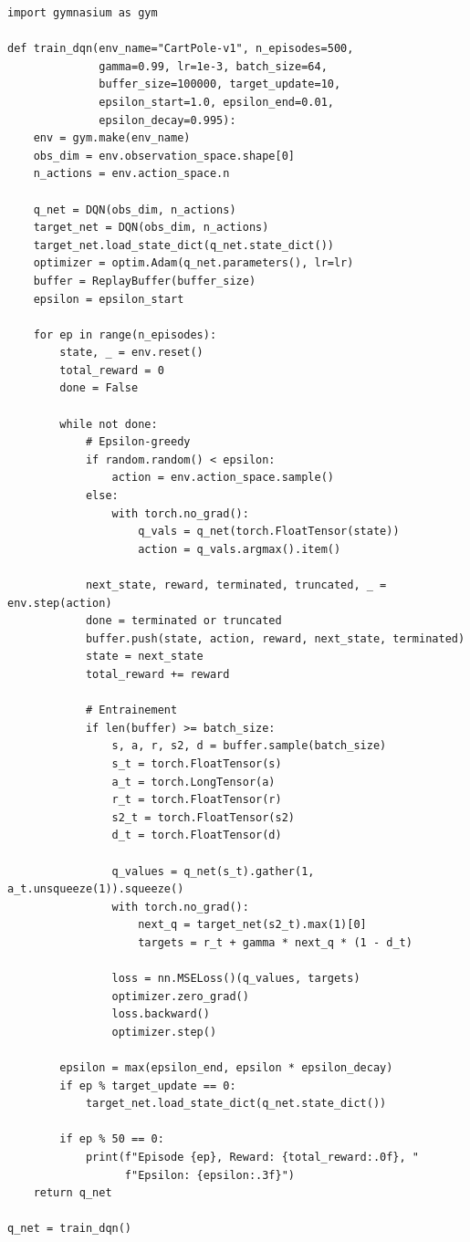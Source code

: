 \begin{codeblock}[title=\textbf{Boucle d'entra\^inement DQN}]
\begin{verbatim}
import gymnasium as gym

def train_dqn(env_name="CartPole-v1", n_episodes=500,
              gamma=0.99, lr=1e-3, batch_size=64,
              buffer_size=100000, target_update=10,
              epsilon_start=1.0, epsilon_end=0.01,
              epsilon_decay=0.995):
    env = gym.make(env_name)
    obs_dim = env.observation_space.shape[0]
    n_actions = env.action_space.n

    q_net = DQN(obs_dim, n_actions)
    target_net = DQN(obs_dim, n_actions)
    target_net.load_state_dict(q_net.state_dict())
    optimizer = optim.Adam(q_net.parameters(), lr=lr)
    buffer = ReplayBuffer(buffer_size)
    epsilon = epsilon_start

    for ep in range(n_episodes):
        state, _ = env.reset()
        total_reward = 0
        done = False

        while not done:
            # Epsilon-greedy
            if random.random() < epsilon:
                action = env.action_space.sample()
            else:
                with torch.no_grad():
                    q_vals = q_net(torch.FloatTensor(state))
                    action = q_vals.argmax().item()

            next_state, reward, terminated, truncated, _ = env.step(action)
            done = terminated or truncated
            buffer.push(state, action, reward, next_state, terminated)
            state = next_state
            total_reward += reward

            # Entrainement
            if len(buffer) >= batch_size:
                s, a, r, s2, d = buffer.sample(batch_size)
                s_t = torch.FloatTensor(s)
                a_t = torch.LongTensor(a)
                r_t = torch.FloatTensor(r)
                s2_t = torch.FloatTensor(s2)
                d_t = torch.FloatTensor(d)

                q_values = q_net(s_t).gather(1, a_t.unsqueeze(1)).squeeze()
                with torch.no_grad():
                    next_q = target_net(s2_t).max(1)[0]
                    targets = r_t + gamma * next_q * (1 - d_t)

                loss = nn.MSELoss()(q_values, targets)
                optimizer.zero_grad()
                loss.backward()
                optimizer.step()

        epsilon = max(epsilon_end, epsilon * epsilon_decay)
        if ep % target_update == 0:
            target_net.load_state_dict(q_net.state_dict())

        if ep % 50 == 0:
            print(f"Episode {ep}, Reward: {total_reward:.0f}, "
                  f"Epsilon: {epsilon:.3f}")
    return q_net

q_net = train_dqn()
\end{verbatim}
\end{codeblock}

